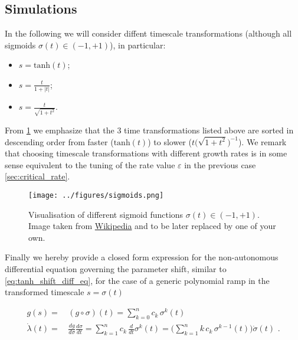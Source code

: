 \documentclass[../main.tex]{subfiles}
\begin{document}
\subsection{Simulations}\label{subsec:simulations}

In the following we will consider diffent timescale transformations (although all sigmoids $\sigma(t)\in(-1,+1)$), in particular:
\begin{itemize}
     \item $s = \text{tanh}(t)$;
     \item $s = \frac{t}{1 + |t|}$;
     \item $s = \frac{t}{\sqrt{1 + t^{2}}}$.
\end{itemize}
From \ref{fig:sigmoids} we emphasize that the $3$ time transformations listed above are sorted in descending order from faster ($\text{tanh}(t)$) to slower ($t\big(\sqrt{1+t^{2}}\big)^{-1}$).
We remark that choosing timescale transformations with different growth rates is in some sense equivalent to the tuning of the rate value $\varepsilon$ in the previous case \ref{sec:critical_rate}.

\begin{figure}[H]
    \centering 
    \texttt{[image: ../figures/sigmoids.png]}
    \caption{Visualisation of different sigmoid functions $\sigma(t)\in(-1,+1)$. 
    Image taken from \href{https://en.wikipedia.org/wiki/Sigmoid_function\#Examples}{Wikipedia} and to be later replaced by one of your own.}
    \label{fig:sigmoids}
\end{figure}

Finally we hereby provide a closed form expression for the non-autonomous differential equation governing the parameter shift, similar to \eqref{eq:tanh_shift_diff_eq}, for the case of a generic polynomial ramp in the transformed timescale $s = \sigma(t)$

\begin{align}
        g(s) =&\, (g\circ\sigma)(t) = \sum_{k=0}^{n}c_{k}\,\sigma^{k}(t)\nonumber \\
        \dot{\lambda}(t) =&\, \frac{dg}{d\sigma}\frac{d\sigma}{dt} = \sum_{k=1}^{n}c_{k}\,\frac{d}{dt}\sigma^{k}(t) = \Bigg(\sum_{k=1}^{n}k\,c_{k}\,\sigma^{k-1}(t)\Bigg)\dot{\sigma}(t)\, \,. \label{eq:sigm_shift_diff_eq}
\end{align}


\end{document}
